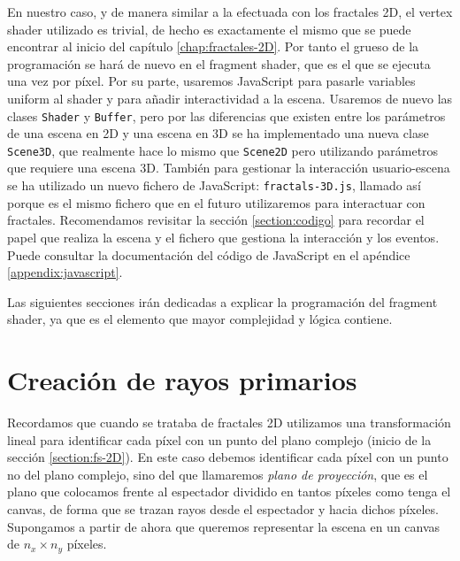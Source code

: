 En nuestro caso, y de manera similar a la efectuada con los fractales 2D, el vertex shader utilizado es trivial, de hecho es exactamente el mismo que se puede encontrar al inicio del capítulo \ref{chap:fractales-2D}. Por tanto el grueso de la programación se hará de nuevo en el fragment shader, que es el que se ejecuta una vez por píxel. Por su parte, usaremos JavaScript para pasarle variables uniform al shader y para añadir interactividad a la escena. Usaremos de nuevo las clases \verb|Shader| y \verb|Buffer|, pero por las diferencias que existen entre los parámetros de una escena en 2D y una escena en 3D se ha implementado una nueva clase \verb|Scene3D|, que realmente hace lo mismo que \verb|Scene2D| pero utilizando parámetros que requiere una escena 3D. También para gestionar la interacción usuario-escena se ha utilizado un nuevo fichero de JavaScript: \verb|fractals-3D.js|, llamado así porque es el mismo fichero que en el futuro utilizaremos para interactuar con fractales. Recomendamos revisitar la sección \ref{section:codigo} para recordar el papel que realiza la escena y el fichero que gestiona la interacción y los eventos. Puede consultar la documentación del código de JavaScript en el apéndice \ref{appendix:javascript}.

Las siguientes secciones irán dedicadas a explicar la programación del fragment shader, ya que es el elemento que mayor complejidad y lógica contiene.

\section{Creación de rayos primarios}
\label{section:rayo}

Recordamos que cuando se trataba de fractales 2D utilizamos una transformación lineal para identificar cada píxel con un punto del plano complejo (inicio de la sección \ref{section:fs-2D}). En este caso debemos identificar cada píxel con un punto no del plano complejo, sino del que llamaremos \textit{plano de proyección}, que es el plano que colocamos frente al espectador dividido en tantos píxeles como tenga el canvas, de forma que se trazan rayos desde el espectador y hacia dichos píxeles. Supongamos a partir de ahora que queremos representar la escena en un canvas de $n_x\times n_y$ píxeles.

